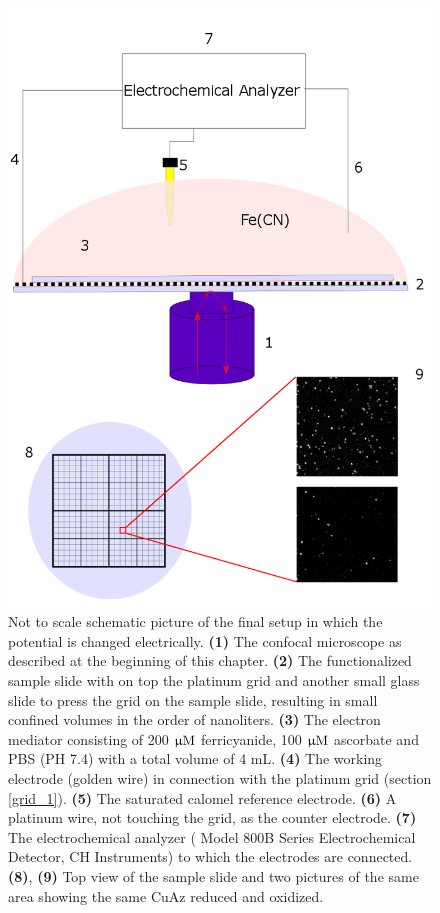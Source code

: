 \documentclass[twoside,single]{lion-msc}
\begin{document}
\begin{figure}[ht!]
\centering
\includegraphics[width=.75 \textwidth]{final_setup}
\caption{Not to scale schematic picture of the final setup in which the potential is changed electrically. \textbf{(1)} The confocal microscope as described at the beginning of this chapter. \textbf{(2)} The functionalized sample slide with on top the platinum grid and another small glass slide to press the grid on the sample slide, resulting in small confined volumes in the order of nanoliters. \textbf{(3)} The electron mediator consisting of 200 $\upmu \textup{M}$ ferricyanide, 100 $\upmu \textup{M}$ ascorbate and PBS (PH 7.4) with a total volume of 4 mL. \textbf{(4)} The working electrode (golden wire) in connection with the platinum grid (section \ref{grid_1}). \textbf{(5)} The saturated calomel reference electrode. \textbf{(6)} A platinum wire, not touching the grid, as the counter electrode. \textbf{(7)} The electrochemical analyzer ( Model 800B Series Electrochemical Detector, CH Instruments) to which the electrodes are connected. \textbf{(8)}, \textbf{(9)} Top view of the sample slide and two pictures of the same area showing the same CuAz reduced and oxidized.}
\label{final_setup}
\end{figure}
\end{document}

